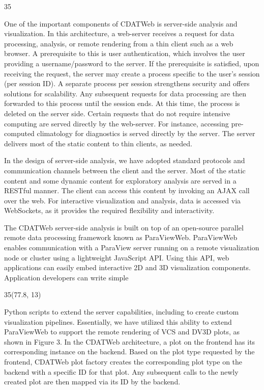 \documentclass[a0,landscape]{a0poster}
\newenvironment{pcol}[1]{
  \begin{minipage}[t]{#1}
}{
  \end{minipage}
}
\begin{document}
\begin{textblock}{35}
\begin{pcol}{\threecolwidth}
One of the important components of CDATWeb is server-side analysis and visualization. In this architecture, a web-server receives a request for data processing, analysis, or remote rendering from a thin client such as a web browser. A prerequisite to this is user authentication, which involves the user providing a username/password to the server. If the prerequisite is satisfied, upon receiving the request, the server may create a process specific to the user’s session (per session ID). A separate process per session strengthens security and offers solutions for scalability. Any subsequent requests for data processing are then forwarded to this process until the session ends. At this time, the process is deleted on the server side. Certain requests that do not require intensive computing are served directly by the web-server. For instance, accessing pre-computed climatology for diagnostics is served directly by the server. The server delivers most of the static content to thin clients, as needed.

In the design of server-side analysis, we have adopted standard protocols and communication channels between the client and the server. Most of the static content and some dynamic content for exploratory analysis are served in a RESTful manner. The client can access this content by invoking an AJAX call over the web. For interactive visualization and analysis, data is accessed via WebSockets, as it provides the required flexibility and interactivity.

The CDATWeb server-side analysis is built on top of an open-source parallel remote data processing framework known as ParaViewWeb. ParaViewWeb enables communication with a ParaView server running on a remote visualization node or cluster using a lightweight JavaScript API. Using this API, web applications can easily embed interactive 2D and 3D visualization components. Application developers can write simple

\begin{textblock}{35}(77.8, 13)
\begin{pcol}{35cm}

Python scripts to extend the server capabilities, including to create custom visualization pipelines. Essentially, we have utilized this ability to extend ParaViewWeb to support the remote rendering of VCS
and DV3D plots, as shown in Figure 3.  In the CDATWeb architecture, a plot on the frontend has its corresponding instance on the backend. Based on the plot type requested by the frontend, CDATWeb plot factory creates the corresponding plot type on the backend with a specific ID for that plot. Any subsequent calls to the newly created plot are then mapped via its ID by the backend.


\end{pcol}
\end{textblock}
\end{pcol}
\end{textblock}
\end{document}

